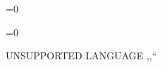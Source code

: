 \ifnum{}=0
    
\else
\ifnum{}=0
    
\else
    UNSUPPORTED LANGUAGE ,,\LANGUAGE ``
\fi
\fi
\newpage